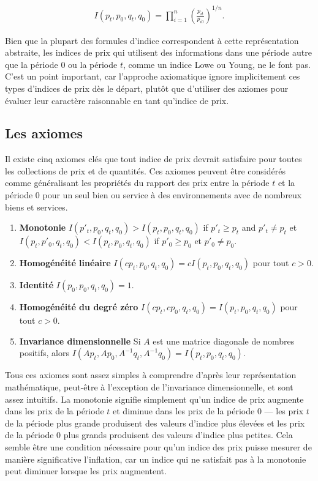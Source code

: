 \documentclass[]{article}
\begin{document}
\begin{align*}
I(p_{t}, p_{0}, q_{t}, q_{0}) = \prod_{i = 1}^{n} \left(\frac{p_{it}} {p_{i0} } \right)^{1 / n}.
\end{align*}

Bien que la plupart des formules d'indice correspondent à cette représentation abstraite, les indices de prix qui utilisent des informations dans une période autre que la période 0 ou la période \(t\), comme un indice Lowe ou Young, ne le font pas. C'est un point important, car l'approche axiomatique ignore implicitement ces types d'indices de prix dès le départ, plutôt que d'utiliser des axiomes pour évaluer leur caractère raisonnable en tant qu'indice de prix.

\hypertarget{les-axiomes}{%
\subsection{Les axiomes}\label{les-axiomes}}

Il existe cinq axiomes clés que tout indice de prix devrait satisfaire pour toutes les collections de prix et de quantités. Ces axiomes peuvent être considérés comme généralisant les propriétés du rapport des prix entre la période \(t\) et la période 0 pour un seul bien ou service à des environnements avec de nombreux biens et services.

\begin{enumerate}
\def\labelenumi{\arabic{enumi}.}
\item
  \textbf{Monotonie} \(I(p'_{t}, p_{0}, q_{t}, q_{0})> I(p_{t}, p_{0}, q_{t}, q_{0})\) if \(p'_{t} \geq p_{t}\) and \(p'_{t} \neq p_{t}\) et \(I(p_{t}, p'_{0}, q_{t}, q_{0}) <I(p_{t}, p_{0}, q_{t}, q_{0})\) if \(p'_{0} \geq p_{0 }\) et \(p'_{0} \neq p_{0}\).
\item
  \textbf{Homogénéité linéaire} \(I(cp_{t}, p_{0}, q_{t}, q_{0}) = cI(p_{t}, p_{0}, q_{t}, q_{0})\) pour tout \(c> 0\).
\item
  \textbf{Identité} \(I(p_{0}, p_{0}, q_{t}, q_{0}) = 1\).
\item
  \textbf{Homogénéité du degré zéro} \(I(cp_{t}, cp_{0}, q_{t}, q_{0}) = I(p_{t}, p_{0}, q_{t} , q_{0})\) pour tout \(c> 0\).
\item
  \textbf{Invariance dimensionnelle} Si \(A\) est une matrice diagonale de nombres positifs, alors \(I(Ap_{t}, Ap_{0}, A^{-1} q_{t}, A^{-1} q_{0}) = I(p_{t}, p_{0}, q_{t}, q_{0})\).
\end{enumerate}

Tous ces axiomes sont assez simples à comprendre d'après leur représentation mathématique, peut-être à l'exception de l'invariance dimensionnelle, et sont assez intuitifs. La monotonie signifie simplement qu'un indice de prix augmente dans les prix de la période \(t\) et diminue dans les prix de la période 0 --- les prix \(t\) de la période plus grande produisent des valeurs d'indice plus élevées et les prix de la période 0 plus grands produisent des valeurs d'indice plus petites. Cela semble être une condition nécessaire pour qu'un indice des prix puisse mesurer de manière significative l'inflation, car un indice qui ne satisfait pas à la monotonie peut diminuer lorsque les prix augmentent.
\end{document}
